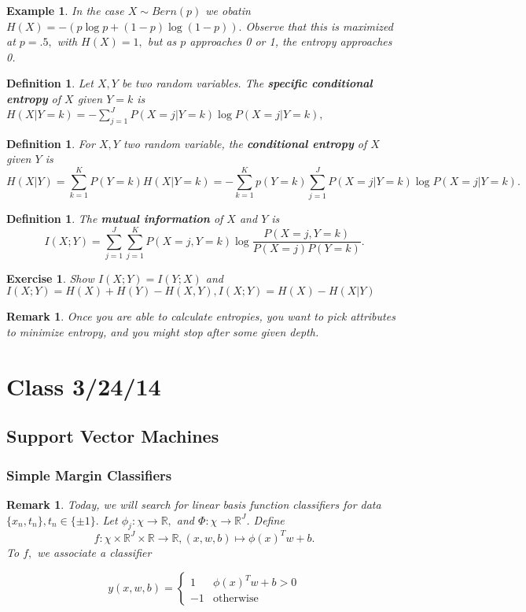 \documentclass{amsart}
\newtheorem{defn}[subsubsection]{Definition}
\newtheorem{rem}[subsubsection]{Remark}
\newtheorem{eg}[subsection]{Example}
\newtheorem{ex}[subsection]{Exercise}
\begin{document}
\begin{eg}
In the case $X \sim Bern(p)$ we obatin $H(X) = -(p\log p + (1-p) \log (1-p)).$ Observe that this is maximized at $p=.5,$ with $H(X) = 1,$ but as $p$ approaches 0 or 1, the entropy approaches 0.
\end{eg}

\begin{defn}
Let $X,Y$ be two random variables. The {\bf specific conditional entropy} of $X$ given $Y=k$ is $H(X|Y=k)=-\sum_{j=1}^J P(X=j|Y=k)\log P(X=j|Y=k),$
\end{defn}

\begin{defn}
For $X,Y$ two random variable, the {\bf conditional entropy} of $X$ given $Y$ is $$H(X|Y) = \sum_{k=1}^KP(Y=k)H(X|Y=k)= -\sum_{k=1}^K p(Y=k) \sum_{j=1}^JP(X=j|Y=k) \log P(X=j|Y=k).$$
\end{defn}

\begin{defn}
The {\bf mutual information} of $X$ and $Y$ is
$$I(X;Y) = \sum_{j=1}^J\sum_{j=1}^K P(X=j,Y=k)\log \frac {P(X=j,Y=k)}{P(X=j)P(Y=k)}.$$
\end{defn}

\begin{ex}
Show $I(X;Y) = I(Y;X)$ and $I(X;Y) = H(X)+H(Y) - H(X,Y), I(X;Y) = H(X)-H(X|Y)$
\end{ex}

\begin{rem}
Once you are able to calculate entropies, you want to pick attributes to minimize entropy, and you might stop after some given depth.
\end{rem}

\section{Class 3/24/14}
\subsection{Support Vector Machines}

\subsubsection{Simple Margin Classifiers}
\begin{rem}
Today, we will search for linear basis function classifiers for data $\{x_n,t_n\},t_n \in \{\pm 1\}.$ Let $\phi_j:\chi \rightarrow \mathbb R,$ and $\Phi:\chi \rightarrow \mathbb R^J$. Define 
$$f:\chi \times  \mathbb R^J \times \mathbb R \rightarrow \mathbb R, (x,w,b)\mapsto \phi(x)^Tw+b.$$ To $f,$ we associate a classifier

$$y(x,w,b) = \begin{cases} 1 & \phi(x)^Tw +b >0 \\ -1 & \text{otherwise} \end{cases}$$
\end{rem}
\end{document}
